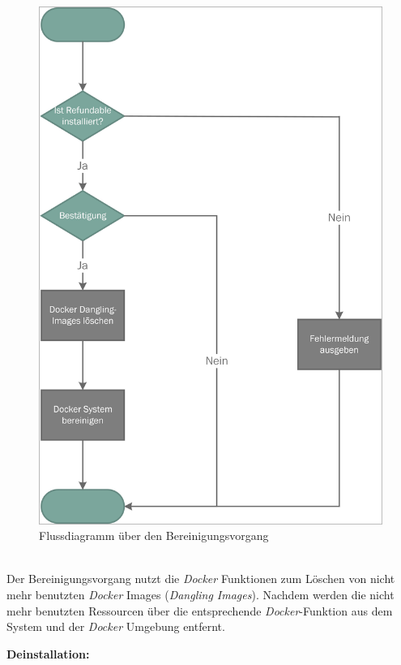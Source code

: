 \begin{figure}[H]
	\centering
	\includegraphics[width=0.55\linewidth]{images/mbeier_konzept/Clean_border}
	\caption[Flussdiagramm über den Bereinigungsvorgang]{Flussdiagramm über den Bereinigungsvorgang}
	\label{fig:clean}
\end{figure}
~\\
Der Bereinigungsvorgang nutzt die \textit{Docker} Funktionen zum Löschen von nicht mehr benutzten \textit{Docker} Images (\textit{Dangling Images}). Nachdem werden die nicht mehr benutzten Ressourcen über die entsprechende \textit{Docker}-Funktion aus dem System und der \textit{Docker} Umgebung entfernt.

\newpage

\textbf{Deinstallation:}

